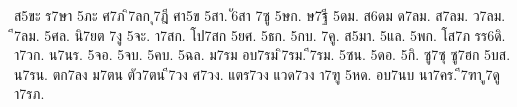 {ส5ขะ
ร7ษา
5ภะ
ศ7ภ
ิ7ลก
ุ7ฎี
ศา5ข
5สา.
ั6สา
7ซู
5ษก.
ษ7ฐี
5ดม.
ส6ดม
ด7ลม.
ส7ลม.
ว7ลม.
ี7ลม.
5ศล.
นิ7ยต
7งู
5จะ.
า7สก.
โป7สก
5ยศ.
5ธก.
5กบ.
7คู.
ส5มา.
5แล.
5พก.
โส7ภ
รร6ดิ.
า7วก.
น7นร.
5จอ.
5จบ.
5คบ.
5ฉล.
ม7รม
อบ7รม
ิ7รม.
ี7รม.
5ซน.
5ดอ.
5กิ.
ซู7ซุ
ซู7ฮก
5บส.
น7รน.
ตก7ลง
ม7ตน
ตัว7ตน
ี7วง
ศ7วง.
แตร7วง
แวด7วง
า7ฑู
5หด.
อบ7นบ
นา7คร.
ี7ฑา
ู7ดู
า7รภ.
}
